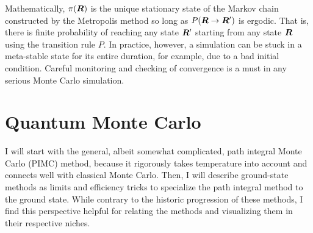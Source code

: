 Mathematically, $\pi(\boldsymbol{R})$ is the unique stationary state of the Markov chain constructed by the Metropolis method so long as $P(\boldsymbol{R}\rightarrow\boldsymbol{R}')$ is ergodic. That is, there is finite probability of reaching any state $\boldsymbol{R}'$ starting from any state $\boldsymbol{R}$ using the transition rule $P$.
In practice, however, a simulation can be stuck in a meta-stable state for its entire duration, for example, due to a bad initial condition. Careful monitoring and checking of convergence is a must in any serious Monte Carlo simulation.

\section{Quantum Monte Carlo}

I will start with the general, albeit somewhat complicated, path integral Monte Carlo (PIMC) method, because it rigorously takes temperature into account and connects well with classical Monte Carlo. Then, I will describe ground-state methods as limits and efficiency tricks to specialize the path integral method to the ground state. While contrary to the historic progression of these methods, I find this perspective helpful for relating the methods and visualizing them in their respective niches.

